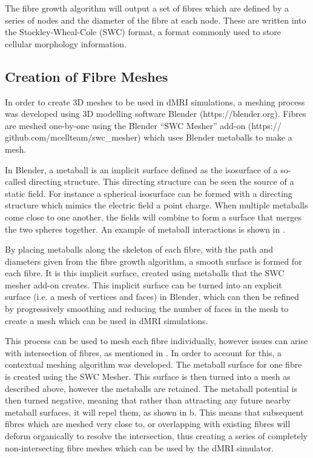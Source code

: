 The fibre growth algorithm will output a set of fibres which are defined by a series of nodes and the diameter of the fibre at each node.
These are written into the Stockley-Wheal-Cole (SWC) format\cite{Stockley1993}, a format commonly used to store cellular morphology information.   
\vspace{-1em}
\subsection{Creation of Fibre Meshes}
\label{sec:creation_of_fibre_meshses}
In order to create 3D meshes to be used in dMRI simulations, a meshing process was developed using 3D modelling software Blender (https://blender.org).
Fibres are meshed one-by-one using the Blender “SWC Mesher” add-on  (https://\\github.com/mcellteam/swc\_mesher) which uses Blender metaballs to make a mesh.

In Blender, a metaball is an implicit surface defined as the isosurface of a so-called directing structure. 
This directing structure can be seen the source of a static field. For instance a spherical isosurface can be formed with a directing structure which mimics the electric field a point charge.
When multiple metaballs come close to one another, the fields will combine to form a surface that merges the two spheres together.
An example of metaball interactions is shown in .

By placing metaballs along the skeleton of each fibre, with the path and diameters given from the fibre growth algorithm, a smooth surface is formed for each fibre.
It is this implicit surface, created using metaballs that the SWC mesher add-on creates. 
This implicit surface can be turned into an explicit surface (i.e. a mesh of vertices and faces) in Blender, which can then be refined by progressively smoothing and reducing the number of faces in the mesh to create a mesh which can be used in dMRI simulations. 

This process can be used to mesh each fibre individually, however issues can arise with intersection of fibres, as mentioned in .
In order to account for this, a contextual meshing algorithm was developed.
The metaball surface for one fibre is created using the SWC Mesher.
This surface is then turned into a mesh as described above, however the metaballs are retained.
The metaball potential is then turned negative, meaning that rather than attracting any future nearby metaball surfaces, it will repel them, as shown in b.
This means that subsequent fibres which are meshed very close to, or overlapping with existing fibres will deform organically to resolve the intersection, thus creating a series of completely non-intersecting fibre meshes which can be used by the dMRI simulator.


